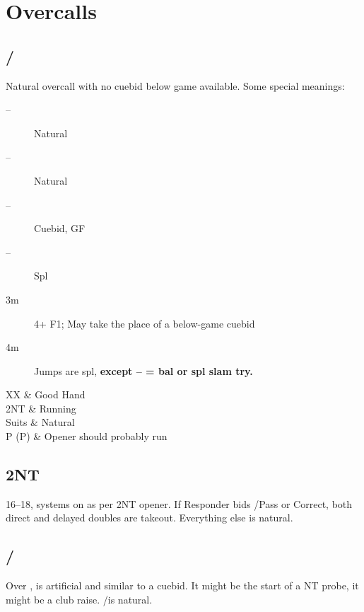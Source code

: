 \documentclass[letterpaper,11pt,oneside]{memoir}
\begin{document}
	\section{Overcalls}	
		
		\subsection{/\sss}
		
		Natural overcall with no cuebid below game available.  Some special meanings:
		
		\begin{description}
			\item[--] Natural
			\item[--] Natural
			\item[--] Cuebid, GF
			\item[--] Spl
			\item[3m] 4+ F1; May take the place of a below-game cuebid
			\item[4m] Jumps are spl, \textbf{except -- = bal or spl slam try.} 
		\end{description}
		
		\begin{bidtable}{
				\begin{auctionhead}
				\end{auctionhead}
			}
			XX & Good Hand \\
			2NT & Running \\
			Suits & Natural \\
			P (P) & Opener should probably run \\
		\end{bidtable}
	
		\subsection{2NT}
		
		16--18, systems on as per 2NT opener.  If Responder bids /\sss Pass or Correct, both direct and delayed doubles are takeout.  Everything else is natural.
		
		\subsection{/\ddd}
		
		\label{minorOC}
		Over ,  is artificial and similar to a cuebid.  It might be the start of a NT probe, it might be a club raise.  /\sss is natural.
		
\end{document}
